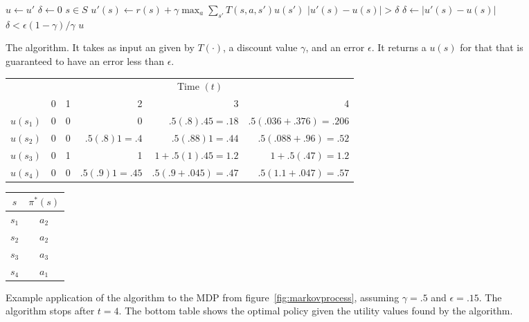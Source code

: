 \begin{SCfigure}
  \begin{minipage}{1.0\linewidth}
    \begin{codebox}
      \li \Do
      \li  $u \gets u'$
      \li $\delta \gets 0$
      \li \For $s \in S$ %
      \li \Do $u'(s) \gets r(s) + \gamma \max_a \sum_{s'} T(s,a,s')
      u(s')$
      \li \If $|u'(s) - u(s)| > \delta$
      \li \Then $\delta \gets |u'(s) - u(s)|$
          \End
       \End
      \li {} $\delta < \epsilon(1-\gamma)/\gamma$
      \End
      \li \Return $u$
    \end{codebox}
  \end{minipage}
  \caption{The  algorithm. It takes as input an
     given by $T(\cdot)$, a discount value $\gamma$, and an
    error $\epsilon$. It returns a $u(s)$ for that  that is
    guaranteed to have an error less than $\epsilon$.}
  \label{fig:value-iter}
\end{SCfigure}

\begin{SCfigure}
  \begin{minipage}{1.0\linewidth}
  \begin{center}
  \begin{tabular}{lrrrrr} \toprule
             & \multicolumn{5}{c}{Time $(t)$} \\  \cmidrule{2-6} 
             & 0 & 1 & 2              & 3 & 4 \\ \midrule
    $u(s_1)$ & 0 & 0 & 0              & $.5(.8).45 = .18$ & $.5(.036 +
    .376) = .206$ \\
    $u(s_2)$ & 0 & 0 & $.5(.8)1 = .4$ & $.5(.88)1 = .44$ & $.5(.088 + .96) = .52$\\
    $u(s_3)$ & 0 & 1 & 1              &$1 + .5(1).45 = 1.2$ & $1 +
    .5(.47) = 1.2$ \\
    $u(s_4)$ & 0 & 0 & $.5(.9)1 =.45$ & $.5(.9 + .045) =.47$ & $.5(1.1 + .047) = .57$\\
    \bottomrule
  \end{tabular}

  \medskip

  \begin{tabular}{cc} \toprule
    $s$ & $\pi^*(s)$ \\ \midrule
    $s_1$ & $a_2$ \\
    $s_2$ & $a_2$ \\
    $s_3$ & $a_3$ \\
    $s_4$ & $a_1$ \\ \bottomrule
  \end{tabular}
  \end{center}
  \end{minipage}
  \caption{Example application of the  algorithm
    to the MDP from figure~\ref{fig:markovprocess}, assuming
    $\gamma=.5$ and $\epsilon = .15$. The algorithm stops after $t=4$.
    The bottom table shows the optimal policy given the utility values
    found by the algorithm.}
  \label{fig:valueiterex}
\end{SCfigure}

